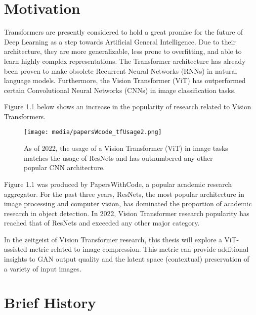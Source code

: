 
\section{Motivation}

Transformers are presently considered to hold a great promise for the future of Deep Learning
as a step towards Artificial General Intelligence.
Due to their architecture, they are more generalizable, less prone to overfitting, and able 
to learn highly complex representations. The Transformer architecture has already been proven 
to make obsolete Recurrent Neural Networks (RNNs) in natural language models. Furthermore, the 
Vision Transformer (ViT) has outperformed certain Convolutional Neural Networks (CNNs) in image classification tasks. \citep{dosovitskiy2020vit}

Figure 1.1 below shows an increase in the popularity of research related to Vision Transformers.

\begin{figure}[H]
	\begin{center}
	\texttt{[image: media/papersWcode\_tfUsage2.png]}
	\end{center}
	\caption[Historical Usage of ViT in Image Tasks]{As of 2022, the usage of a Vision Transformer (ViT) in image 
	tasks matches the usage of ResNets and has outnumbered any other popular CNN architecture.
	\citep{PapersOverTime}}
	\end{figure}

Figure 1.1 was produced by PapersWithCode, a popular academic research aggregator. For the past three years, 
ResNets, the most popular architecture in image processing and computer vision, has dominated the proportion
of academic research in object detection. In 2022, Vision Transformer research popularity has reached
that of ResNets and exceeded any other major category.


In the zeitgeist of Vision Transformer research, this thesis will explore a ViT-assisted metric related to 
image compression. This metric can provide additional insights to GAN output quality 
and the latent space (contextual) preservation of a variety of input images.




\section{Brief History}

